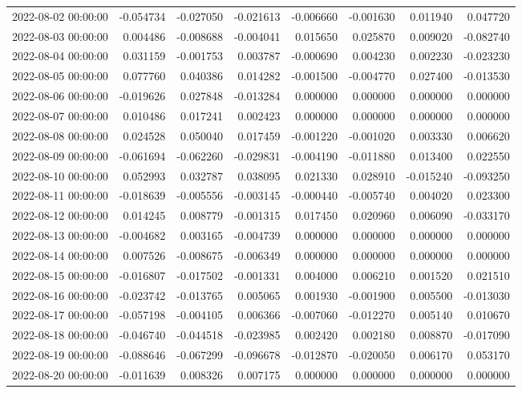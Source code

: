 \begin{tabular}{lrrrrrrr}
2022-08-02 00:00:00 & -0.054734 & -0.027050 & -0.021613 & -0.006660 & -0.001630 & 0.011940 & 0.047720 \\
2022-08-03 00:00:00 & 0.004486 & -0.008688 & -0.004041 & 0.015650 & 0.025870 & 0.009020 & -0.082740 \\
2022-08-04 00:00:00 & 0.031159 & -0.001753 & 0.003787 & -0.000690 & 0.004230 & 0.002230 & -0.023230 \\
2022-08-05 00:00:00 & 0.077760 & 0.040386 & 0.014282 & -0.001500 & -0.004770 & 0.027400 & -0.013530 \\
2022-08-06 00:00:00 & -0.019626 & 0.027848 & -0.013284 & 0.000000 & 0.000000 & 0.000000 & 0.000000 \\
2022-08-07 00:00:00 & 0.010486 & 0.017241 & 0.002423 & 0.000000 & 0.000000 & 0.000000 & 0.000000 \\
2022-08-08 00:00:00 & 0.024528 & 0.050040 & 0.017459 & -0.001220 & -0.001020 & 0.003330 & 0.006620 \\
2022-08-09 00:00:00 & -0.061694 & -0.062260 & -0.029831 & -0.004190 & -0.011880 & 0.013400 & 0.022550 \\
2022-08-10 00:00:00 & 0.052993 & 0.032787 & 0.038095 & 0.021330 & 0.028910 & -0.015240 & -0.093250 \\
2022-08-11 00:00:00 & -0.018639 & -0.005556 & -0.003145 & -0.000440 & -0.005740 & 0.004020 & 0.023300 \\
2022-08-12 00:00:00 & 0.014245 & 0.008779 & -0.001315 & 0.017450 & 0.020960 & 0.006090 & -0.033170 \\
2022-08-13 00:00:00 & -0.004682 & 0.003165 & -0.004739 & 0.000000 & 0.000000 & 0.000000 & 0.000000 \\
2022-08-14 00:00:00 & 0.007526 & -0.008675 & -0.006349 & 0.000000 & 0.000000 & 0.000000 & 0.000000 \\
2022-08-15 00:00:00 & -0.016807 & -0.017502 & -0.001331 & 0.004000 & 0.006210 & 0.001520 & 0.021510 \\
2022-08-16 00:00:00 & -0.023742 & -0.013765 & 0.005065 & 0.001930 & -0.001900 & 0.005500 & -0.013030 \\
2022-08-17 00:00:00 & -0.057198 & -0.004105 & 0.006366 & -0.007060 & -0.012270 & 0.005140 & 0.010670 \\
2022-08-18 00:00:00 & -0.046740 & -0.044518 & -0.023985 & 0.002420 & 0.002180 & 0.008870 & -0.017090 \\
2022-08-19 00:00:00 & -0.088646 & -0.067299 & -0.096678 & -0.012870 & -0.020050 & 0.006170 & 0.053170 \\
2022-08-20 00:00:00 & -0.011639 & 0.008326 & 0.007175 & 0.000000 & 0.000000 & 0.000000 & 0.000000 \\

\end{tabular}
